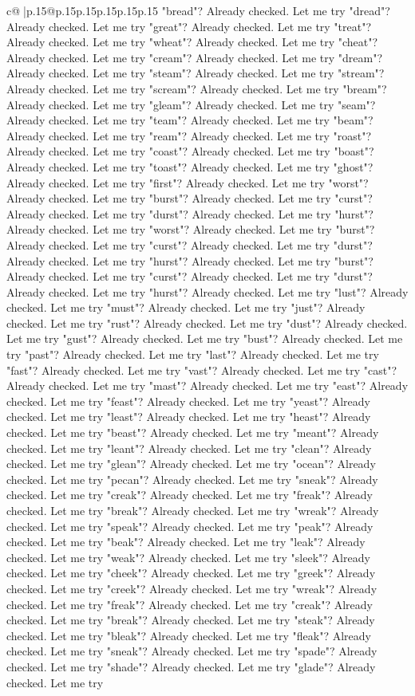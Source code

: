 \documentclass{article}
\begin{document}
{\begin{supertabular}{c@{$\;$}|p{.15\linewidth}@{}p{.15\linewidth}p{.15\linewidth}p{.15\linewidth}p{.15\linewidth}p{.15\linewidth}}
{{{"bread"? Already checked. Let me try "dread"? Already checked. Let me try "great"? Already checked. Let me try "treat"? Already checked. Let me try "wheat"? Already checked. Let me try "cheat"? Already checked. Let me try "cream"? Already checked. Let me try "dream"? Already checked. Let me try "steam"? Already checked. Let me try "stream"? Already checked. Let me try "scream"? Already checked. Let me try "bream"? Already checked. Let me try "gleam"? Already checked. Let me try "seam"? Already checked. Let me try "team"? Already checked. Let me try "beam"? Already checked. Let me try "ream"? Already checked. Let me try "roast"? Already checked. Let me try "coast"? Already checked. Let me try "boast"? Already checked. Let me try "toast"? Already checked. Let me try "ghost"? Already checked. Let me try "first"? Already checked. Let me try "worst"? Already checked. Let me try "burst"? Already checked. Let me try "curst"? Already checked. Let me try "durst"? Already checked. Let me try "hurst"? Already checked. Let me try "worst"? Already checked. Let me try "burst"? Already checked. Let me try "curst"? Already checked. Let me try "durst"? Already checked. Let me try "hurst"? Already checked. Let me try "burst"? Already checked. Let me try "curst"? Already checked. Let me try "durst"? Already checked. Let me try "hurst"? Already checked. Let me try "lust"? Already checked. Let me try "must"? Already checked. Let me try "just"? Already checked. Let me try "rust"? Already checked. Let me try "dust"? Already checked. Let me try "gust"? Already checked. Let me try "bust"? Already checked. Let me try "past"? Already checked. Let me try "last"? Already checked. Let me try "fast"? Already checked. Let me try "vast"? Already checked. Let me try "cast"? Already checked. Let me try "mast"? Already checked. Let me try "east"? Already checked. Let me try "feast"? Already checked. Let me try "yeast"? Already checked. Let me try "least"? Already checked. Let me try "heast"? Already checked. Let me try "beast"? Already checked. Let me try "meant"? Already checked. Let me try "leant"? Already checked. Let me try "clean"? Already checked. Let me try "glean"? Already checked. Let me try "ocean"? Already checked. Let me try "pecan"? Already checked. Let me try "sneak"? Already checked. Let me try "creak"? Already checked. Let me try "freak"? Already checked. Let me try "break"? Already checked. Let me try "wreak"? Already checked. Let me try "speak"? Already checked. Let me try "peak"? Already checked. Let me try "beak"? Already checked. Let me try "leak"? Already checked. Let me try "weak"? Already checked. Let me try "sleek"? Already checked. Let me try "cheek"? Already checked. Let me try "greek"? Already checked. Let me try "creek"? Already checked. Let me try "wreak"? Already checked. Let me try "freak"? Already checked. Let me try "creak"? Already checked. Let me try "break"? Already checked. Let me try "steak"? Already checked. Let me try "bleak"? Already checked. Let me try "fleak"? Already checked. Let me try "sneak"? Already checked. Let me try "spade"? Already checked. Let me try "shade"? Already checked. Let me try "glade"? Already checked. Let me try }}}
\end{supertabular}}
\end{document}
